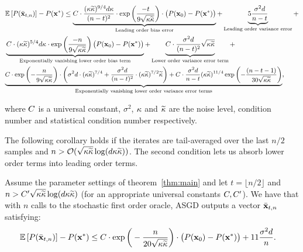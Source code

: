 \begin{theorem}
\begin{align*}
	&\E{P(\bar{\x}_{t,n})}-P(\xs) \leq \underbrace{\UC\cdot\frac{(\cnH\cnS)^{9/4}d\cnH}{(n-t)^2}\cdot\exp\bigg(\frac{-t}{9\sqrt{\cnH\cnS}}\bigg)\cdot\big(P(\x_0)-P(\xs)\big)}_{\text{Leading order bias error}}+\underbrace{5\frac{\sigma^2d}{n-t}}_{\text{Leading order variance error}} + \nonumber\\&\underbrace{\UC\cdot(\cnH\cnS)^{5/4}d\cnH\cdot\exp\left(\frac{-n }{9\sqrt{\cnH\cnS}}\right) \big(P(\x_0)-P(\xs)\big)}_{\text{Exponentially vanishing lower order bias term}} + \underbrace{\UC\cdot\frac{\sigma^2 d}{(n-t)^2} \sqrt{\cnH\cnS}}_{\text{Lower order variance error term}}+\nonumber\\ &{\small \underbrace{\UC\cdot\exp\bigg({-\frac{n}{9\sqrt{\cnH\cnS}}}\bigg)\cdot\bigg(\sigma^2d\cdot(\cnH\cnS)^{7/4}+\frac{\sigma^2d}{(n-t)^2}\cdot(\cnH\cnS)^{7/2}\cnS\bigg)+C\cdot\frac{\sigma^2d}{n-t}(\cnH\cnS)^{11/4}\exp\bigg({-\frac{(n-t-1)}{30\sqrt{\cnH\cnS}}}\bigg)}_{\text{Exponentially vanishing lower order variance error terms}}},%
	\end{align*}

	\vspace{-0.3cm}
	\noindent 
	where $C$ is a universal constant, $\sigma^2$, ${\kappa}$ and $\widetilde{\kappa}$ are the noise level, condition number and statistical condition number respectively.
\end{theorem}
The following corollary holds if the iterates are tail-averaged over the last $n/2$ samples and $n>\mathcal{O}(\sqrt{{\kappa}\widetilde{\kappa}}\log(d{\kappa}\widetilde{\kappa}))$. The second condition lets us absorb lower order terms into leading order terms. 
\begin{corollary}\label{cor:lowerOrder}
Assume the parameter settings of theorem~\ref{thm:main} and
let $t=\lfloor n/2 \rfloor$ and $n>C'\sqrt{{\kappa}\widetilde{\kappa}}\log(d{\kappa}\widetilde{\kappa})$ (for
an appropriate universal constants $C,C'$).
We have that with $n$ calls to the stochastic first order oracle,
ASGD outputs a vector $\bar{\mathbf{x}}_{t,n}$
satisfying:\vspace*{-2mm}
	\begin{align*}
	&\mathbb{E}\left[P(\bar{\mathbf{x}}_{t,n})\right]-P(\mathbf{x}^*) \leq C \cdot\exp\bigg(-\frac{n}{20\sqrt{{\kappa}\widetilde{\kappa}}}\bigg)\cdot\big(P(\mathbf{x}_0)-P(\mathbf{x}^*)\big)+11\frac{\sigma^2d}{n}.
	\end{align*}
\end{corollary}


